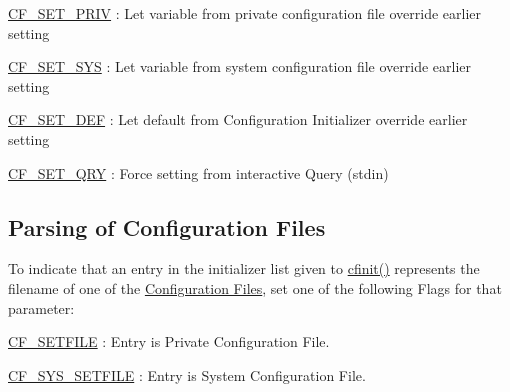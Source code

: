 \begin{DoxyItemize}
\item \hyperlink{group__special__options__mask_gaabf1d4d312964af93bd55f71eeec6988}{C\-F\-\_\-\-S\-E\-T\-\_\-\-P\-R\-I\-V} \-: Let variable from private configuration file override earlier setting
\end{DoxyItemize}


\begin{DoxyItemize}
\item \hyperlink{group__special__options__mask_ga8fe09807491ee119290329cf08e6f340}{C\-F\-\_\-\-S\-E\-T\-\_\-\-S\-Y\-S} \-: Let variable from system configuration file override earlier setting
\end{DoxyItemize}


\begin{DoxyItemize}
\item \hyperlink{group__special__options__mask_ga17b4ef5b35afe21a4a80faa671030b65}{C\-F\-\_\-\-S\-E\-T\-\_\-\-D\-E\-F} \-: Let default from Configuration Initializer override earlier setting
\end{DoxyItemize}


\begin{DoxyItemize}
\item \hyperlink{group__special__options__mask_ga09dcbb96c5ace43a7d5e7e4f52d387a8}{C\-F\-\_\-\-S\-E\-T\-\_\-\-Q\-R\-Y} \-: Force setting from interactive Query ({\ttfamily stdin})
\end{DoxyItemize}\hypertarget{config_levels_config_file_parsing}{}\subsection{Parsing of Configuration Files}\label{config_levels_config_file_parsing}
To indicate that an entry in the initializer list given to \hyperlink{group__cflib__core_ga64fb341565c2ddfccd6669e5e6265a8a}{cfinit()} represents the filename of one of the \hyperlink{config_files}{Configuration Files}, set one of the following Flags for that parameter\-:


\begin{DoxyItemize}
\item \hyperlink{group__special__options__mask_gafeeb63d4d8c498bec4a237ad8b94f02f}{C\-F\-\_\-\-S\-E\-T\-F\-I\-L\-E} \-: Entry is Private Configuration File. 
\begin{DoxyItemize}
\item \hyperlink{group__special__options__mask_gabb03ea68e07e388da2c1337a1582c72e}{C\-F\-\_\-\-S\-Y\-S\-\_\-\-S\-E\-T\-F\-I\-L\-E} \-: Entry is System Configuration File. 
\end{DoxyItemize}
\end{DoxyItemize}

